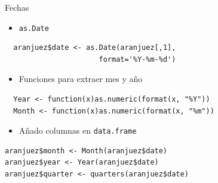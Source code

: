 \documentclass[xcolor={usenames,svgnames,dvipsnames}]{beamer}
\begin{document}
\begin{frame}[fragile,label=sec-5-3-3]{Fechas}
 \begin{itemize}
\item \texttt{as.Date}
\end{itemize}
\lstset{language=R,label= ,caption= ,numbers=none}
\begin{lstlisting}
  aranjuez$date <- as.Date(aranjuez[,1],
                      format='%Y-%m-%d')
\end{lstlisting}

\begin{itemize}
\item Funciones para extraer mes y año
\end{itemize}
\lstset{language=R,label= ,caption= ,numbers=none}
\begin{lstlisting}
  Year <- function(x)as.numeric(format(x, "%Y"))
  Month <- function(x)as.numeric(format(x, "%m"))
\end{lstlisting}

\begin{itemize}
\item Añado columnas en \texttt{data.frame}
\end{itemize}
\lstset{language=R,label= ,caption= ,numbers=none}
\begin{lstlisting}
aranjuez$month <- Month(aranjuez$date)
aranjuez$year <- Year(aranjuez$date)
aranjuez$quarter <- quarters(aranjuez$date)
\end{lstlisting}
\end{frame}
\end{document}
